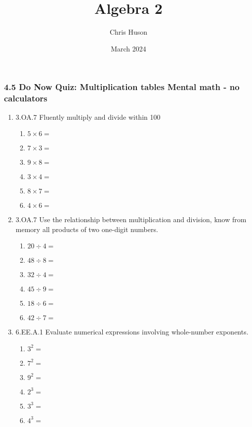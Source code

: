 \documentclass[12pt, twoside]{article}
\title{Algebra 2}
\author{Chris Huson}
\date{March 2024}
\begin{document}
\subsubsection*{4.5 Do Now Quiz: Multiplication tables \hfill Mental math - no calculators}
\begin{enumerate}[itemsep=0.5cm]

\item 3.OA.7 Fluently multiply and divide within 100
    \begin{multicols}{2}
    \begin{enumerate}[itemsep=0.5cm]
        \item $5 \times 6 =$
        \item $7 \times 3 =$
        \item $9 \times 8 =$
        \item $3 \times 4 =$
        \item $8 \times 7 =$
        \item $4 \times 6 =$
    \end{enumerate}
    \end{multicols}

\item 3.OA.7 Use the relationship between multiplication and division, know from memory all products of two one-digit numbers.
    \begin{multicols}{2}
    \begin{enumerate}[itemsep=0.5cm]
        \item $20 \div 4 =$
        \item $48 \div 8 =$
        \item $32 \div 4 =$
        \item $45 \div 9 =$
        \item $18 \div 6 =$
        \item $42 \div 7 =$
    \end{enumerate}
    \end{multicols}

\item 6.EE.A.1 Evaluate numerical expressions involving whole-number exponents.
    \begin{multicols}{2}
    \begin{enumerate}[itemsep=0.5cm]
        \item $3^2=$
        \item $7^2=$
        \item $9^2=$
        \item $2^3=$
        \item $3^3=$
        \item $4^3=$
    \end{enumerate}
    \end{multicols}


\end{enumerate}
\end{document}
